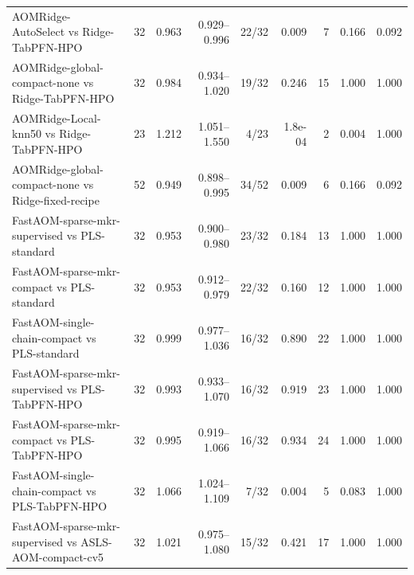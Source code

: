 \begin{tabularx}{\linewidth}{Xrrrrrrrr}
AOMRidge-\allowbreak{}AutoSelect vs Ridge-\allowbreak{}TabPFN-\allowbreak{}HPO & 32 & 0.963 & 0.929--0.996 & 22/32 & 0.009 & 7 & 0.166 & 0.092 \\
AOMRidge-\allowbreak{}global-\allowbreak{}compact-\allowbreak{}none vs Ridge-\allowbreak{}TabPFN-\allowbreak{}HPO & 32 & 0.984 & 0.934--1.020 & 19/32 & 0.246 & 15 & 1.000 & 1.000 \\
AOMRidge-\allowbreak{}Local-\allowbreak{}knn50 vs Ridge-\allowbreak{}TabPFN-\allowbreak{}HPO & 23 & 1.212 & 1.051--1.550 & 4/23 & 1.8e-04 & 2 & 0.004 & 1.000 \\
AOMRidge-\allowbreak{}global-\allowbreak{}compact-\allowbreak{}none vs Ridge-\allowbreak{}fixed-\allowbreak{}recipe & 52 & 0.949 & 0.898--0.995 & 34/52 & 0.009 & 6 & 0.166 & 0.092 \\
FastAOM-\allowbreak{}sparse-\allowbreak{}mkr-\allowbreak{}supervised vs PLS-\allowbreak{}standard & 32 & 0.953 & 0.900--0.980 & 23/32 & 0.184 & 13 & 1.000 & 1.000 \\
FastAOM-\allowbreak{}sparse-\allowbreak{}mkr-\allowbreak{}compact vs PLS-\allowbreak{}standard & 32 & 0.953 & 0.912--0.979 & 22/32 & 0.160 & 12 & 1.000 & 1.000 \\
FastAOM-\allowbreak{}single-\allowbreak{}chain-\allowbreak{}compact vs PLS-\allowbreak{}standard & 32 & 0.999 & 0.977--1.036 & 16/32 & 0.890 & 22 & 1.000 & 1.000 \\
FastAOM-\allowbreak{}sparse-\allowbreak{}mkr-\allowbreak{}supervised vs PLS-\allowbreak{}TabPFN-\allowbreak{}HPO & 32 & 0.993 & 0.933--1.070 & 16/32 & 0.919 & 23 & 1.000 & 1.000 \\
FastAOM-\allowbreak{}sparse-\allowbreak{}mkr-\allowbreak{}compact vs PLS-\allowbreak{}TabPFN-\allowbreak{}HPO & 32 & 0.995 & 0.919--1.066 & 16/32 & 0.934 & 24 & 1.000 & 1.000 \\
FastAOM-\allowbreak{}single-\allowbreak{}chain-\allowbreak{}compact vs PLS-\allowbreak{}TabPFN-\allowbreak{}HPO & 32 & 1.066 & 1.024--1.109 & 7/32 & 0.004 & 5 & 0.083 & 1.000 \\
FastAOM-\allowbreak{}sparse-\allowbreak{}mkr-\allowbreak{}supervised vs ASLS-\allowbreak{}AOM-\allowbreak{}compact-\allowbreak{}cv5 & 32 & 1.021 & 0.975--1.080 & 15/32 & 0.421 & 17 & 1.000 & 1.000 \\
\bottomrule
\end{tabularx}
